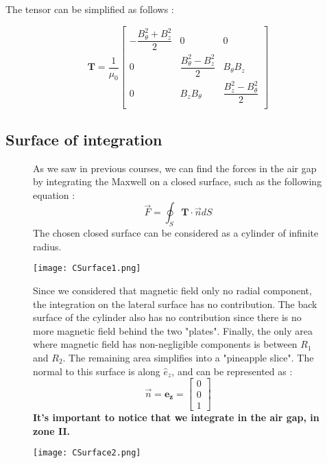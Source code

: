 The tensor can be simplified as follows :

\begin{equation*}
\mathbf{T} = \dfrac{1}{\mu_0}
\begin{bmatrix}
 - \dfrac{B_{\theta}^2 + B_z^2}{2} &0 & 0  \\
0 & \dfrac{B_{\theta}^2 - B_z^2}{2} & B_{\theta}B_z \\
0 & B_zB_{\theta} & \dfrac{B_z^2 - B_{\theta}^2}{2}\\
\end{bmatrix}
\end{equation*}


\subsection*{Surface of integration}
\begin{figure}[H]
   \begin{minipage}[b]{.66\linewidth}

As we saw in previous courses, we can find the forces in the air gap by integrating the Maxwell on a closed surface, such as the following equation :  
\begin{equation*}
\vec{F} = \oint_S \mathbf{T}\cdot \vec{n} dS
\end{equation*}
   The chosen closed surface can be considered as a cylinder of infinite radius.
\end{minipage} \hfill
   \begin{minipage}[b]{.26\linewidth}
      \texttt{[image: CSurface1.png]}
          \label{CS1}
   \end{minipage}
\end{figure}

\begin{figure}[H]
\begin{minipage}[b]{.7\linewidth}
Since we considered that magnetic field only no radial component, the integration on the lateral surface has no contribution. The back surface of the cylinder also has no contribution since there is no more magnetic field behind the two "plates". Finally, the only area where magnetic field has non-negligible components is between $R_1$ and $R_2$. The remaining area simplifies into a "pineapple slice". The normal to this surface is along $\hat{e}_z$, and can be represented as :
\begin{equation*}
\vec{n} = \mathbf{e_z} =  \begin{bmatrix}
 0  \\ 0 \\ 1 
\end{bmatrix}   
\end{equation*}
\textbf{It's important to notice that we integrate in the air gap, in zone II.}
\end{minipage}
\hfill
\begin{minipage}[b]{.2\linewidth}
\texttt{[image: CSurface2.png]}
\end{minipage}
\end{figure}

